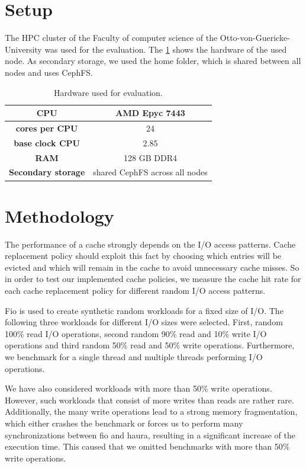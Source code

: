 \documentclass[
	12pt,
	a4paper,
	abstract,
	bibliography=totoc,
	chapterprefix,
	headings=openright,
	numbers=endperiod,
	parskip=half,
	twoside,
]{scrreprt}
\begin{document}
\section{Setup}
\label{sec:setup}

The HPC cluster of the Faculty of computer science of the Otto-von-Guericke-University was used for the evaluation.
The \cref{tab:hardware node} shows the hardware of the used node.
As secondary storage, we used the home folder, which is shared between all nodes and uses CephFS.

\begin{table}[ht]
	\centering
	\begin{tabular}{|c|c|}
		\hline
		\textbf{CPU} & AMD Epyc 7443\\
		\hline
		\textbf{cores per CPU} & 24\\
		\hline
		\textbf{base clock CPU} & 2.85\\
		\hline
		\textbf{RAM} & 128 GB DDR4\\
		\hline
		\textbf{Secondary storage} & shared CephFS across all nodes \\
		\hline
	\end{tabular}
	\caption{Hardware used for evaluation.}
	\label{tab:hardware node}
\end{table}


\section{Methodology}
\label{sec:methodology}

The performance of a cache strongly depends on the I/O access patterns.
Cache replacement policy should exploit this fact by 
choosing which entries will be evicted and which will remain in the cache 
to avoid unnecessary cache misses.
So in order to test our implemented cache policies,
we measure the cache hit rate for each cache replacement policy for different 
random I/O access patterns.

Fio is used to create synthetic random workloads for a fixed size of I/O.
The following three workloads for different I/O sizes were selected.
First, random 100\% read I/O operations, second random 90\% read and 10\% write I/O operations
and third random 50\% read and 50\% write operations. 
Furthermore, we benchmark for a single thread and multiple threads performing I/O operations.

We have also considered workloads with more than 50\% write operations.
However, such workloads that consist of more writes than reads are rather rare. 
Additionally, the many write operations lead to a strong memory fragmentation, 
which either crashes the benchmark or forces us to perform many synchronizations between fio and haura, 
resulting in a significant increase of the execution time.
This caused that we omitted benchmarks with more than 50\% write operations.
\end{document}
